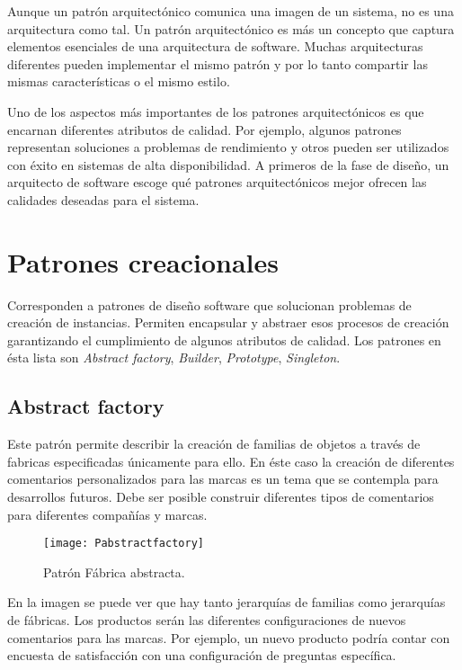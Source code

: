 Aunque un patrón arquitectónico comunica una imagen de un sistema, no es una arquitectura como tal. Un patrón arquitectónico es más un concepto que captura elementos esenciales de una arquitectura de software. Muchas arquitecturas diferentes pueden implementar el mismo patrón y por lo tanto compartir las mismas características o el mismo estilo. 

Uno de los aspectos más importantes de los patrones arquitectónicos es que encarnan diferentes atributos de calidad. Por ejemplo, algunos patrones representan soluciones a problemas de rendimiento y otros pueden ser utilizados con éxito en sistemas de alta disponibilidad. A primeros de la fase de diseño, un arquitecto de software escoge qué patrones arquitectónicos mejor ofrecen las calidades deseadas para el sistema.

\section{Patrones creacionales} \label{patrones}

Corresponden a patrones de diseño software que solucionan problemas de creación de instancias. Permiten encapsular y abstraer esos procesos de creación garantizando el cumplimiento de algunos atributos de calidad. Los patrones en ésta lista son \textit{Abstract factory}, \textit{Builder}, \textit{Prototype}, \textit{Singleton}.

\subsection{Abstract factory}

Este patrón permite describir la creación de familias de objetos a través de fabricas especificadas únicamente para ello.  En éste caso la creación de diferentes comentarios personalizados para las marcas es un tema que se contempla para desarrollos futuros. Debe ser posible construir diferentes tipos de comentarios para diferentes compañías y marcas. 

\begin{figure}[H]
\centering
\texttt{[image: Pabstractfactory]}
\caption{Patrón Fábrica abstracta.}
\end{figure}

En la imagen se puede ver que hay tanto jerarquías de familias como jerarquías de fábricas. Los productos serán las diferentes configuraciones de nuevos comentarios para las marcas.  Por ejemplo, un nuevo producto podría contar con encuesta de satisfacción con una configuración de preguntas específica.

